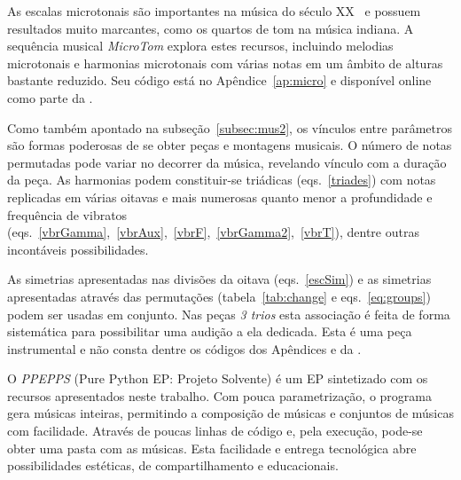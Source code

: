 As escalas microtonais são importantes na música do século XX~\cite{microtonalidade} e possuem resultados muito marcantes, como os quartos de tom na música indiana. A sequência musical \emph{MicroTom} explora estes recursos, incluindo melodias microtonais e harmonias microtonais com várias notas em um âmbito de alturas bastante reduzido. Seu código está no Apêndice~\ref{ap:micro} e disponível online como parte da \massa.

Como também apontado na subseção~\ref{subsec:mus2}, os vínculos entre parâmetros são formas poderosas de se obter peças e montagens musicais. O número de notas permutadas pode variar no decorrer da música, revelando vínculo com a duração da peça. As harmonias podem constituir-se triádicas (eqs.~\ref{triades}) com notas replicadas em várias oitavas e mais numerosas quanto menor a profundidade e frequência de vibratos (eqs.~\ref{vbrGamma},~\ref{vbrAux},~\ref{vbrF},~\ref{vbrGamma2},~\ref{vbrT}), dentre outras incontáveis possibilidades.

As simetrias apresentadas nas divisões da oitava (eqs.~\ref{escSim}) e as simetrias apresentadas através das permutações (tabela~\ref{tab:change} e eqs.~\ref{eq:groups}) podem ser usadas em conjunto. Nas peças \emph{3 trios} esta associação é feita de forma sistemática para possibilitar uma audição a ela dedicada. Esta é uma peça instrumental e não consta dentre os códigos dos Apêndices e da \massa.\cite{3Trios}

O \emph{PPEPPS} (Pure Python EP: Projeto Solvente) é um EP sintetizado com os recursos apresentados neste trabalho. Com pouca parametrização, o programa gera músicas inteiras, permitindo a composição de músicas e conjuntos de músicas com facilidade. Através de poucas linhas de código e, pela execução, pode-se obter uma pasta com as músicas. Esta facilidade e entrega tecnológica abre possibilidades estéticas, de compartilhamento e educacionais.
